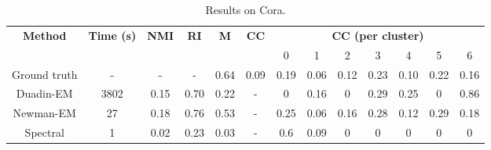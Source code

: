 \documentclass[switch, 12pt]{article}
\begin{document}
\begin{table}[H]
    \centering
    \setlength\heavyrulewidth{0.25ex}
    \begin{tabular}{@{}ccccccccccccc@{}}
        \toprule
        \multirow{2}{*}{\textbf{Method}}  & \multirow{2}{*}{\textbf{Time (s)}} & \multirow{2}{*}{\textbf{NMI}} & \multirow{2}{*}{\textbf{RI}} & \multirow{2}{*}{\textbf{M}} & \multirow{2}{*}{\textbf{CC}} & \multicolumn{7}{c}{\textbf{CC (per cluster)}}                                           \\
                                          &                                    &                               &                              &                             &                              & 0                                             & 1    & 2    & 3    & 4    & 5    & 6    \\ \midrule
        \multicolumn{1}{c|}{Ground truth} & \multicolumn{1}{c|}{-}             & -                             & \multicolumn{1}{c|}{-}       & 0.64                        & 0.09                         & 0.19                                          & 0.06 & 0.12 & 0.23 & 0.10 & 0.22 & 0.16 \\
        \multicolumn{1}{c|}{Duadin-EM}    & \multicolumn{1}{c|}{3802}          & 0.15                          & \multicolumn{1}{c|}{0.70}    & 0.22                        & -                            & 0                                             & 0.16 & 0    & 0.29 & 0.25 & 0    & 0.86 \\
        \multicolumn{1}{c|}{Newman-EM}    & \multicolumn{1}{c|}{27}            & 0.18                          & \multicolumn{1}{c|}{0.76}    & 0.53                        & -                            & 0.25                                          & 0.06 & 0.16 & 0.28 & 0.12 & 0.29 & 0.18 \\
        \multicolumn{1}{c|}{Spectral}     & \multicolumn{1}{c|}{1}             & 0.02                          & \multicolumn{1}{c|}{0.23}    & 0.03                        & -                            & 0.6                                           & 0.09 & 0    & 0    & 0    & 0    & 0    \\ \bottomrule
    \end{tabular}
    \caption{Results on Cora.}
    \label{tab:cora_results}
\end{table}
\end{document}
